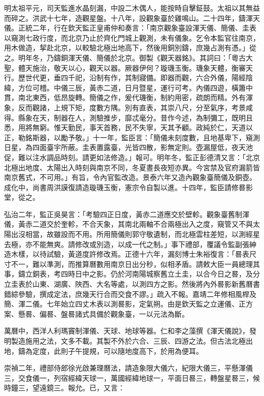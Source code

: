 \begin{pinyinscope}
明太祖平元，司天監進水晶刻漏，中設二木偶人，能按時自擊鉦鼓。太祖以其無益而碎之。洪武十七年，造觀星盤。十八年，設觀象臺於雞鳴山。二十四年，鑄渾天儀。正統二年，行在欽天監正皇甫仲和奏言：「南京觀象臺設渾天儀、簡儀、圭表以窺測七政行度，而北京乃止於齊化門城上觀測，未有儀象。乞令本監官往南京，用木做造，挈赴北京，以較驗北極出地高下，然後用銅別鑄，庶幾占測有憑。」從之。明年冬，乃鑄銅渾天儀、簡儀於北京。御製《觀天器銘》。其詞曰：「粵古大聖，體天施治，敬天以心，觀天以器。厥器伊何？璇璣玉衡。璣象天體，衡審天行。歷世代更，垂四千祀，沿制有作，其制寢備。即器而觀，六合外儀，陽經陰緯，方位可稽。中儀三辰，黃赤二道，日月暨星，運行可考。內儀四遊，橫簫中貫，南北東西，低昂旋轉。簡儀之作，爰代璣衡，制約用密，疏朗而精。外有渾象，反而觀諸，上規下矩，度數方隅。別有直表，其崇八尺，分至氣序，考景咸得。縣象在天，制器在人，測驗推步，靡忒毫分。昔作今述，為制彌工，既明且悉，用將無窮。惟天勤民，事天首務，民不失寧，天其予顧。政純於仁，天道以正，勒銘斯器，以勵予敬。」十一年，監臣言：「簡儀未刻度數，且地基卑下，窺測日星，為四面臺宇所蔽。圭表置露臺，光皆四散，影無定則。壺漏屋低，夜天池促，難以注水調品時刻。請更如法修造。」報可。明年冬，監正彭德清又言：「北京北極出地度、太陽出入時刻與南京不同，冬夏晝長夜短亦異。今宮禁及官府漏箭皆南京舊式，不可用。」有旨，令內官監改造。景泰六年又造內觀象臺簡儀及銅壺。成化中，尚書周洪謨復請造璇璣玉衡，憲宗令自製以進。十四年，監臣請修晷影堂，從之。

弘治二年，監正吳昊言：「考驗四正日度，黃赤二道應交於壁軫。觀象臺舊制渾儀，黃赤二道交於奎軫，不合天象，其南北兩軸不合兩極出入之度，窺管又不與太陽出沒相當，故雖設而不用。所用簡儀則郭守敬遺制，而北極雲柱差短，以測經星去極，亦不能無爽。請修改或別造，以成一代之制。」事下禮部，覆議令監副張紳造木樣，以待試驗，黃道度許修改焉。正德十六年，漏刻博士朱裕復言：「晷表尺寸不一，難以準測，而推算曆數用南京日出分秒，似相矛盾。請敕大臣一員總理其事，鑄立銅表，考四時日中之影。仍於河南陽城察舊立土圭，以合今日之晷，及分立圭表於山東、湖廣、陜西、大名等處，以測四方之影。然後將內外晷影新舊曆書錯綜參驗，撰成定法，庶幾天行合而交食不謬。」疏入不報。嘉靖二年修相風桿及簡、渾二儀。七年始立四丈木表以測晷影，定氣朔。由是欽天監之立運儀、正方案、懸晷、偏晷、盤晷諸式具備於觀象臺，一以元法為斷。

萬曆中，西洋人利瑪竇制渾儀、天球、地球等器。仁和李之藻撰《渾天儀說》，發明製造施用之法，文多不載。其製不外於六合、三辰、四游之法。但古法北極出地，鑄為定度，此則子午提規，可以隨地度高下，於用為便耳。

崇禎二年，禮部侍郎徐光啟兼理曆法，請造象限大儀六，紀限大儀三，平懸渾儀三，交食儀一，列宿經緯天球一，萬國經緯地球一，平面日晷三，轉盤星晷三，候時鐘三，望遠鏡三。報允。已，又言：


\end{pinyinscope}
